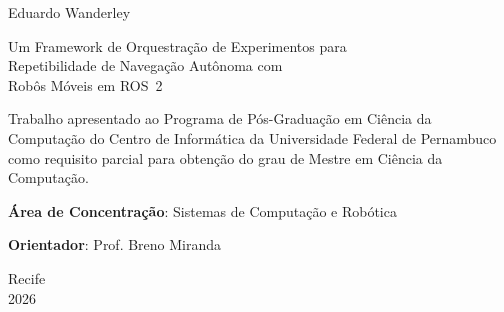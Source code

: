 \begin{titlepage}
\centering

{\normalsize Eduardo Wanderley}

\vspace{3cm}

{\normalsize
Um Framework de Orquestração de Experimentos para\\
Repetibilidade de Navegação Autônoma com\\
Robôs Móveis em ROS~2
}

\vspace{3cm}

\hfill
\begin{minipage}{0.5\textwidth}
\small
Trabalho apresentado ao Programa de Pós-Graduação em Ciência da Computação do Centro de Informática da Universidade Federal de Pernambuco como requisito parcial para obtenção do grau de Mestre em Ciência da Computação.

\vspace{0.5cm}
\textbf{Área de Concentração}: Sistemas de Computação e Robótica

\vspace{0.5cm}
\textbf{Orientador}: Prof. Breno Miranda
\end{minipage}

\vfill

{\normalsize Recife}\\
{\normalsize 2026}

\end{titlepage}
